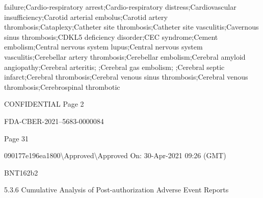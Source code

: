 \begin{refsection}
\begin{tcolorbox}[quote]
failure;Cardio-respiratory arrest;Cardio-respiratory distress;Cardiovascular insufficiency;Carotid arterial embolus;Carotid artery thrombosis;Cataplexy;Catheter site thrombosis;Catheter site vasculitis;Cavernous sinus thrombosis;CDKL5 deficiency disorder;CEC syndrome;Cement embolism;Central nervous system lupus;Central nervous system vasculitis;Cerebellar artery thrombosis;Cerebellar embolism;Cerebral amyloid angiopathy;Cerebral arteritis; ;Cerebral gas embolism; ;Cerebral septic infarct;Cerebral thrombosis;Cerebral venous sinus thrombosis;Cerebral venous thrombosis;Cerebrospinal thrombotic

CONFIDENTIAL Page 2

FDA-CBER-2021--5683-0000084

Page 31

090177e196ea1800\textbackslash{}Approved\textbackslash{}Approved On: 30-Apr-2021 09:26 (GMT)

BNT162b2

5.3.6 Cumulative Analysis of Post-authorization Adverse Event Reports


\end{tcolorbox}
\end{refsection}
